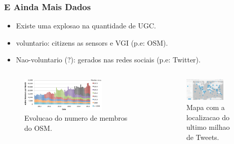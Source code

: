 \documentclass[hyperref={pdfpagelabels=true}]{beamer}
\begin{document}
\begin{frame}
\frametitle{E Ainda Mais Dados}
      \begin{itemize}
        \item<1->Existe uma explosao na quantidade de UGC.
        \item<1->voluntario: citizens as sensors e VGI (p.e: OSM).
        \item<1->Nao-voluntario (?): gerados nas redes sociais (p.e: Twitter).        
      \end{itemize}                

    \begin{columns}
    \begin{column}{0.5\textwidth}
        \begin{figure}  
            \includegraphics[width=0.7\textwidth]{osm_members.png}\\
            \tiny{Evolucao do numero de membros do OSM.}
        \end{figure}             
    \end{column}
    \begin{column}{0.5\textwidth}
        \begin{figure}  
            \includegraphics[width=0.7\textwidth]{twittermap.png}\\
            \tiny{Mapa com a localizacao do ultimo milhao de Tweets.}
        \end{figure}  
    \end{column}  
    \end{columns} 

\end{frame}
\end{document}
